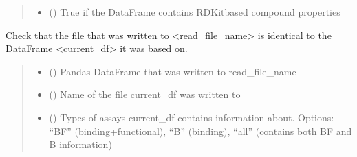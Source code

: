 \documentclass[letterpaper,10pt,english]{sphinxmanual}
\begin{document}
\begin{fulllineitems}
\begin{quote}
\begin{description}
\begin{itemize}
\item {} 
\sphinxAtStartPar
{} () \textendash{} True if the DataFrame contains RDKit\sphinxhyphen{}based compound properties

\end{itemize}

\end{description}\end{quote}

\end{fulllineitems}


\begin{fulllineitems}
\label{\detokenize{sanity_checks:sanity_checks.test_equality}}
\pysigstartsignatures
{}
\pysigstopsignatures
\sphinxAtStartPar
Check that the file that was written to \textless{}read\_file\_name\textgreater{}
is identical to the DataFrame \textless{}current\_df\textgreater{} it was based on.
\begin{quote}\begin{description}
\begin{itemize}
\item {} 
\sphinxAtStartPar
{} () \textendash{} Pandas DataFrame that was written to read\_file\_name

\item {} 
\sphinxAtStartPar
{} () \textendash{} Name of the file current\_df was written to

\item {} 
\sphinxAtStartPar
{} () \textendash{} Types of assays current\_df contains information about.         Options:    “BF” (binding+functional),
“B” (binding),
“all” (contains both BF and B information)


\end{itemize}
\end{description}
\end{quote}
\end{fulllineitems}
\end{document}
